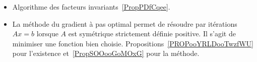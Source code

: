 
\begin{itemize}
	\item Algorithme des facteurs invariants~\ref{PropPDfCqee}.
	\item La méthode du gradient à pas optimal permet de résoudre par itérations \( Ax=b\) lorsque \( A\) est symétrique strictement définie positive. Il s'agit de minimiser une fonction bien choisie. Propositions~\ref{PROPooYRLDooTwzfWU} pour l'existence et~\ref{PropSOOooGoMOxG} pour la méthode.
\end{itemize}
